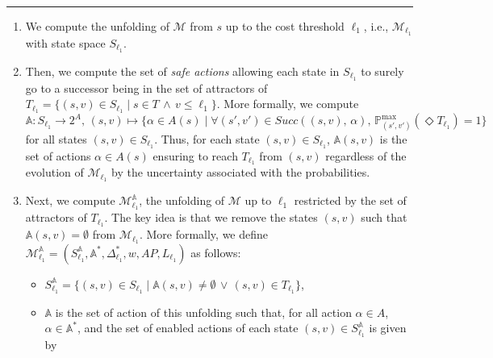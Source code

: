 \begin{center}
  \hrule height.8pt depth0pt \kern2pt%
  \label{sspwe-algo}
  \vspace{-.02\linewidth}
  \offinterlineskip\hrulefill
\begin{enumerate}
  \item We compute the unfolding of $\mathcal{M}$ from $s$ up to the cost threshold $\ell_1$, i.e., $\mathcal{M}_{\ell_1}$ with state space $S_{\ell_1}$.
  \item Then, we compute the set of \textit{safe actions} allowing each state in $S_{\ell_1}$ to surely go to a successor being in the set of attractors of
  $T_{\ell_1} = \{ (s, v) \in S_{\ell_1} \; | \; s \in T \, \wedge \, v \leq \ell_1 \}$.
  More formally, we compute \[\mathbb{A}: S_{\ell_1} \rightarrow 2^A, \, (s, v) \mapsto \{ \alpha \in A(s) \; | \; \forall (s', v') \in Succ((s, v), \, \alpha), \, \mathbb{P}^{\max}_{(s', v')}(\Diamond T_{\ell_1}) = 1 \}\]
  for all states $(s, v) \in S_{\ell_1}$. Thus, for each state $(s, v) \in S_{\ell_1}$, $\mathbb{A}(s, v)$
  is the set of actions $\alpha \in A(s)$ ensuring to reach $T_{\ell_1}$ from $(s, v)$ regardless of the evolution of $\mathcal{M}_{\ell_1}$ by the uncertainty associated with the probabilities.
  \item Next, we compute $\mathcal{M}^\mathbb{A}_{\ell_1}$, the unfolding of $\mathcal{M}$ up to $\ell_1$ restricted by the set of attractors of $T_{\ell_1}$. The key idea is that we remove the states $(s, v)$ such that $\mathbb{A}(s, v) = \emptyset$ from $\mathcal{M}_{\ell_1}$. More formally,
  we define $\mathcal{M}^\mathbb{A}_{\ell_1} = (S^\mathbb{A}_{\ell_1}, \mathbb{A}^*, \Delta^*_{\ell_1}, w, AP, L_{\ell_1})$ as follows:
  \begin{itemize}
    \item $S^\mathbb{A}_{\ell_1} = \{ (s, v) \in S_{\ell_1} \; | \; \mathbb{A}(s, v) \neq \emptyset \, \vee \, (s, v) \in T_{\ell_1} \}$,
    \item $\mathbb{A}$ is the set of action of this unfolding such that, for all action $\alpha \in A$, $\alpha \in \mathbb{A}^*$, and the set of enabled actions of each state $(s, v) \in S^\mathbb{A}_{\ell_1}$ is given by %

\end{itemize}
\end{enumerate}
\end{center}
